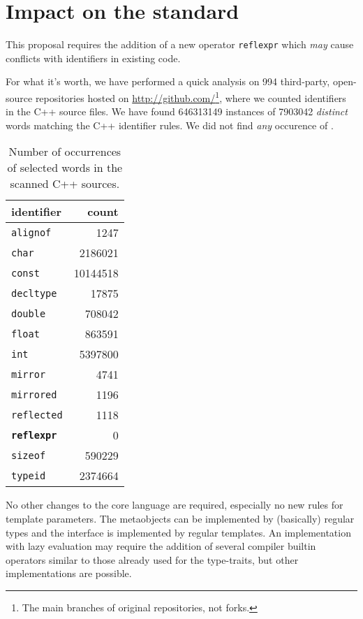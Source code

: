 \section{Impact on the standard}

This proposal requires the addition of a new operator
\texttt{reflexpr} which {\em may} cause conflicts with identifiers in existing code.

For what it's worth, we have performed a quick analysis on \num{994} third-party, open-source
repositories hosted on \url{http://github.com/}\footnote{The main branches
of original repositories, not forks.}, where we counted identifiers
in the C++ source files. We have found \num{646313149} instances of
\num{7903042} {\em distinct} words matching the C++ identifier rules.
We did not find {\em any} occurence of .

\begin{table}[h]
\centering
\begin{tabular}{|l|r|}
\hline
\textbf{identifier} & \textbf{count} \\\hline
\hline
\texttt{alignof} & \num{1247} \\\hline
\texttt{char} & \num{2186021} \\\hline
\texttt{const} & \num{10144518} \\\hline
\texttt{decltype} & \num{17875} \\\hline
\texttt{double} & \num{708042} \\\hline
\texttt{float} & \num{863591} \\\hline
\texttt{int} & \num{5397800} \\\hline
\texttt{mirror} & \num{4741} \\\hline
\texttt{mirrored} & \num{1196} \\\hline
\texttt{reflected} & \num{1118} \\\hline
\textbf{\texttt{reflexpr}} & \num{0} \\\hline
\texttt{sizeof} & \num{590229} \\\hline
\texttt{typeid} & \num{2374664} \\\hline


\end{tabular}
\label{table-identifier-occurences}
\caption{Number of occurrences of selected words in the scanned C++ sources.}
\end{table}


No other changes to the core language are required, especially no new rules
for template parameters. The metaobjects can be implemented by (basically) regular
types and the interface is implemented by regular templates.
An implementation with lazy evaluation may require the addition of several compiler builtin
operators similar to those already used for the type-traits, but other
implementations are possible.
